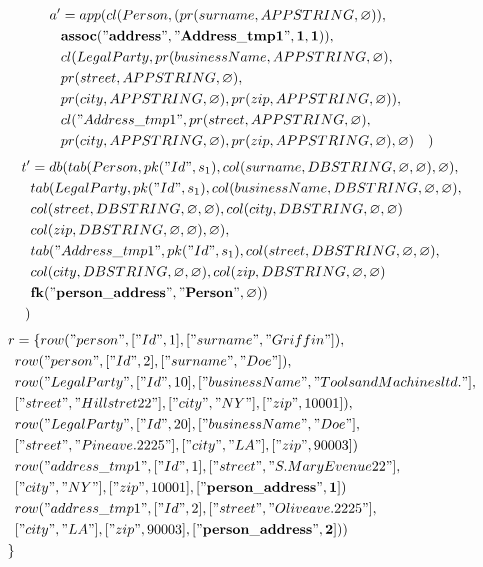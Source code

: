 \documentclass[11pt]{article}
\begin{document}
\hline
\begin{align*}
a' &= app(cl(Person, (pr(surname, APPSTRING, \varnothing)), \\ 
& \mathbf{assoc("address", "Address\_tmp1", 1, 1)}), \\ 
& cl(LegalParty, pr(businessName, APPSTRING, \varnothing), \\
& pr(street, APPSTRING, \varnothing), \\
& pr(city, APPSTRING, \varnothing), pr(zip, APPSTRING, \varnothing)), \\
& cl("Address\_tmp1", pr(street, APPSTRING, \varnothing), \\
& pr(city, APPSTRING, \varnothing), pr(zip, APPSTRING, \varnothing), \varnothing)
& )
\end{align*}
\begin{align*}
t' &=db(tab(Person, pk("Id", s_1), col(surname, DBSTRING, \varnothing, \varnothing), \varnothing), \\
& tab(LegalParty, pk("Id", s_1),  col(businessName, DBSTRING, \varnothing, \varnothing), \\
& col(street, DBSTRING, \varnothing, \varnothing), col(city, DBSTRING, \varnothing, \varnothing) \\
& col(zip, DBSTRING, \varnothing, \varnothing), \varnothing), \\
& tab("Address\_tmp1", pk("Id", s_1), col(street, DBSTRING, \varnothing, \varnothing),\\
& col(city, DBSTRING, \varnothing, \varnothing), col(zip, DBSTRING, \varnothing, \varnothing) \\
& \mathbf{fk("person\_address", "Person", \varnothing)})\\
) 
\end{align*}
\begin{align*}
r &=\{ row("person", ["Id", 1], ["surname", "Griffin"]), \\
& row("person", ["Id", 2], ["surname", "Doe"]), \\
& row("LegalParty", ["Id", 10], ["businessName", "Tools and Machines ltd."], \\
& ["street", "Hill stret 22"], ["city", "NY"], ["zip", 10001]), \\
& row("LegalParty", ["Id", 20], ["businessName", "Doe"], \\
& ["street", "Pine ave. 2225"], ["city", "LA"], ["zip", 90003])\\
& row("address\_tmp1", ["Id", 1], ["street", "S. Mary Evenue 22"], \\
& ["city", "NY"], ["zip", 10001], \mathbf{["person\_address", 1]}) \\
& row("address\_tmp1", ["Id", 2], ["street", "Olive ave. 2225"], \\
& ["city", "LA"], ["zip", 90003], \mathbf{["person\_address", 2]}) )\\
\}
\end{align*}
\end{document}
